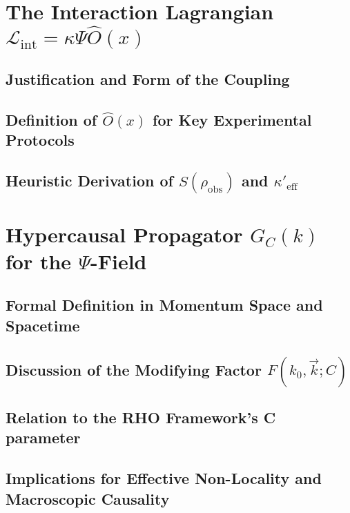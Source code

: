 \documentclass{report}
\begin{document}
    \section{The Interaction Lagrangian $\mathcal{L}_{\text{int}} = \kappa\Psi\hat{O}(x)$}
    \label{app_sec:interaction_lagrangian}
        \subsection{Justification and Form of the Coupling}
        \label{app_subsec:justification_form_coupling}
        \subsection{Definition of $\hat{O}(x)$ for Key Experimental Protocols}
        \label{app_subsec:def_O_operator}
        \subsection{Heuristic Derivation of $S(\rho_{\text{obs}})$ and $\kappa'_{\text{eff}}$}
        \label{app_subsec:heuristic_deriv_S_kappa_eff} %

    \section{Hypercausal Propagator $G_C(k)$ for the $\Psi$-Field}
    \label{app_sec:hypercausal_propagator_psi}
        \subsection{Formal Definition in Momentum Space and Spacetime}
        \label{app_subsec:formal_def_momentum_spacetime}
        \subsection{Discussion of the Modifying Factor $F(k_0, \vec{k}; C)$}
        \label{app_subsec:discussion_modifying_factor_F}
        \subsection{Relation to the RHO Framework’s C parameter}
        \label{app_subsec:relation_rho_C_param}
        \subsection{Implications for Effective Non-Locality and Macroscopic Causality}
        \label{app_subsec:implications_nonlocality_causality}
\end{document}
